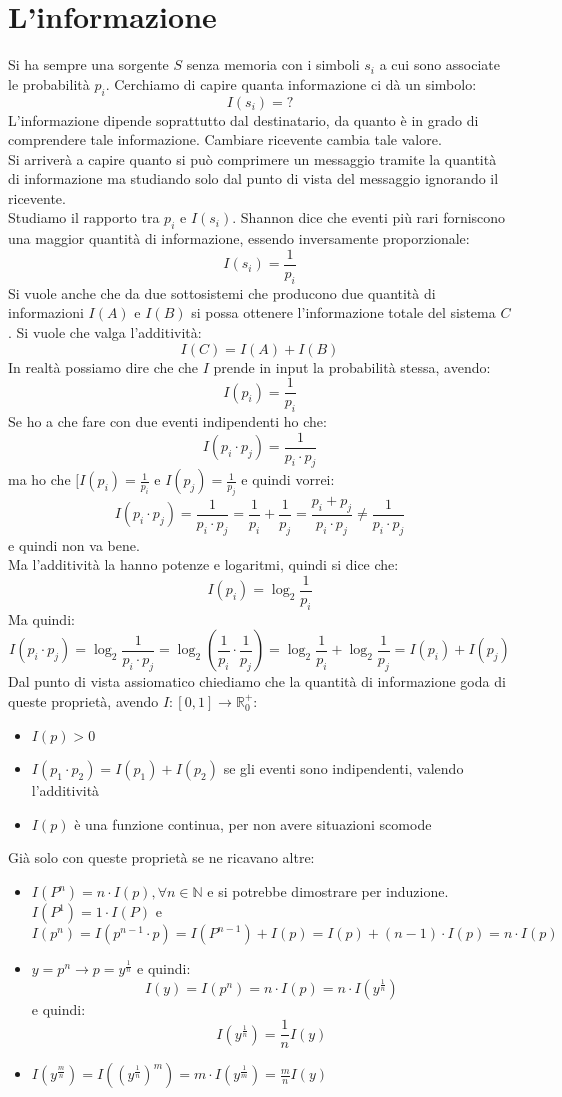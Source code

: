 \documentclass[a4paper,12pt, oneside]{book}
\begin{document}
\section{L'informazione}
Si ha sempre una sorgente $S$ senza memoria con i simboli $s_i$ a cui sono
associate le probabilità $p_i$. Cerchiamo di capire quanta informazione ci dà un
simbolo:
\[I(s_i)=?\]
L'informazione dipende soprattutto dal destinatario, da quanto è in grado di
comprendere tale informazione. Cambiare ricevente cambia tale valore.\\
Si arriverà a capire quanto si può comprimere un messaggio tramite la quantità
di informazione ma studiando solo dal punto di vista del messaggio ignorando il
ricevente.\\
Studiamo il rapporto tra $p_i$ e $I(s_i)$. Shannon dice che eventi più rari
forniscono una maggior quantità di informazione, essendo inversamente
proporzionale: 
\[I(s_i)=\frac{1}{p_i}\]
Si vuole anche che da due sottosistemi che producono due quantità di
informazioni $I(A)$ e $I(B)$ si possa ottenere l'informazione totale del
sistema $C$. Si vuole che valga l'additività:
\[I(C)=I(A)+I(B)\]
In realtà possiamo dire che che $I$ prende in input la probabilità stessa,
avendo:
\[I(p_i)=\frac{1}{p_i}\]
Se ho a che fare con due eventi indipendenti ho che:
\[I(p_i\cdot p_j)=\frac{1}{p_i\cdot p_j}\]
ma ho che $[I(p_i)=\frac{1}{p_i}$ e $I(p_j)=\frac{1}{p_j}$ e quindi vorrei:
\[I(p_i\cdot p_j)=\frac{1}{p_i\cdot
    p_j}=\frac{1}{p_i}+\frac{1}{p_j}=\frac{p_i+p_j}{p_i\cdot p_j}\neq
  \frac{1}{p_i\cdot p_j}\]
e quindi non va bene.\\
Ma l'additività la hanno potenze e logaritmi, quindi si dice che:
\[I(p_i)=\log_2\frac{1}{p_i}\]
Ma quindi:
\[I(p_i\cdot p_j)=\log_2\frac{1}{p_i\cdot
    p_j}=\log_2\left(\frac{1}{p_i}\cdot\frac{1}{p_j}\right)=
  \log_2\frac{1}{p_i}+\log_2\frac{1}{p_j}=I(p_i)+I(p_j)\]
Dal punto di vista assiomatico chiediamo che la quantità di informazione goda di
queste proprietà, avendo $I:[0,1]\to\mathbb{R}_0^+$:
\begin{itemize}
  \item $I(p)>0$
  \item $I(p_1\cdot p_2)=I(p_1)+I(p_2)$ se gli eventi sono indipendenti, valendo
  l'additività 
  \item $I(p)$ è una funzione continua, per non avere situazioni scomode
\end{itemize}
Già solo con queste proprietà se ne ricavano altre:
\begin{itemize}
  \item $I(P^n)=n\cdot I(p),\forall n\in \mathbb{N}$ e si potrebbe dimostrare
  per induzione. $I(P^1)=1\cdot I(P)$ e \[I(p^n)=I(p^{n-1}\cdot
    p)=I(P^{n-1})+I(p)=I(p)+(n-1)\cdot I(p)=n\cdot I(p)\]
  \item $y=p^n\to p=y^{\frac{1}{n}}$ e quindi:
  \[I(y)=I(p^n)=n\cdot I(p)=n\cdot I(y^{\frac{1}{n}})\]
  e quindi:
  \[I(y^{\frac{1}{n}})=\frac{1}{n}I(y)\]
  \item $I(y^\frac{m}{n})= I((y^{\frac{1}{n}})^m)=m\cdot
  I(y^{\frac{1}{m}})=\frac{m}{n}I(y)$ 
\end{itemize}
\end{document}
